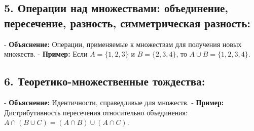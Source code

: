 \documentclass[11pt]{article}
\begin{document}
	\subsection*{5. Операции над множествами: объединение, пересечение, разность, симметрическая разность:}
	- \textbf{Объяснение:} Операции, применяемые к множествам для получения новых множеств.
	- \textbf{Пример:} Если \( A = \{1, 2, 3\} \) и \( B = \{2, 3, 4\} \), то \( A \cup B = \{1, 2, 3, 4\} \).
	
	\subsection*{6. Теоретико-множественные тождества:}
	- \textbf{Объяснение:} Идентичности, справедливые для множеств.
	- \textbf{Пример:} Дистрибутивность пересечения относительно объединения: \( A \cap (B \cup C) = (A \cap B) \cup (A \cap C) \).
	
\end{document}
